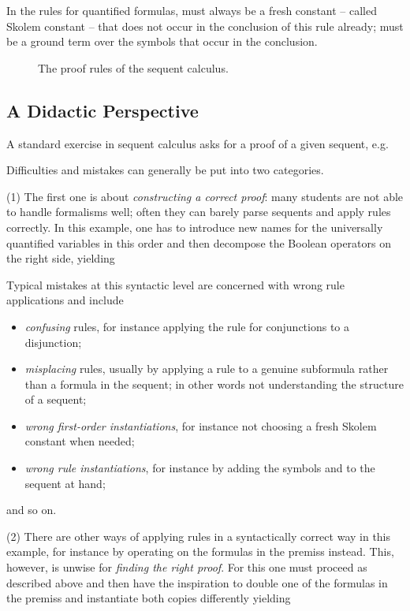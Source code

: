 \documentclass[a4paper,UKenglish]{lipics}
\begin{document}
In the rules for quantified formulas,  must always be a fresh constant -- called Skolem constant -- that does not occur in the conclusion of 
this rule already;  must be a ground term over the symbols that occur in the conclusion.

\begin{figure}[t]





\caption{The proof rules of the sequent calculus.}
\label{fig:rules} 
\end{figure}

\subsection{A Didactic Perspective}
\label{didactics}

A standard exercise in sequent calculus asks for a proof of a given sequent, e.g.\ 

Difficulties and mistakes can generally be put into two categories. 
\medskip

(1) The first one is about \emph{constructing a correct proof}: many students are not able to handle formalisms well; often they can barely parse  
sequents and apply rules correctly. In this example, one has to introduce new names for the universally quantified variables  in this order and 
then decompose the Boolean operators on the right side, yielding 

Typical mistakes at this syntactic level are concerned with wrong rule applications and include 
\begin{itemize}
\item \emph{confusing} rules, for instance applying the rule for conjunctions to a disjunction;
\item \emph{misplacing} rules, usually by applying a rule to a genuine subformula rather than a formula in the sequent; in other words not
      understanding the structure of a sequent;
\item \emph{wrong first-order instantiations}, for instance not choosing a fresh Skolem constant when needed;
\item \emph{wrong rule instantiations}, for instance by adding the symbols  and  to the sequent at hand; 
\end{itemize}
and so on.
\medskip

(2) There are other ways of applying rules in a syntactically correct way in this example, for instance by operating on the formulas in the premiss 
instead. This, however, is unwise for \emph{finding the right proof}. For this one must proceed as described above and then have the inspiration to 
double one of the formulas in the premiss and instantiate both copies differently yielding
\end{document}
